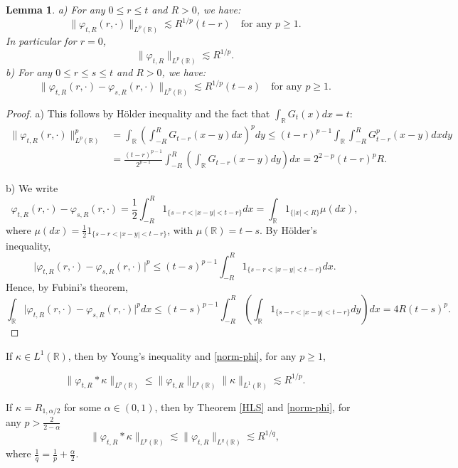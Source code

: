 \documentclass[12pt]{article}
\newtheorem{lemma}[theorem]{Lemma}
\def\bR{\mathbb{R}}
\newcommand{\les}{\lesssim}
\def\k{\kappa}
\begin{document}
\begin{lemma}
a) For any $0 \leq r\leq t$ and $R>0$, we have:
\begin{equation}
\label{norm-phi}
\|\varphi_{t,R}(r, \cdot)\|_{L^p(\bR)} \les R^{1/p}(t-r) \quad \mbox{for any $p\geq 1$}.
\end{equation} 
In particular for $r = 0$,
\[
\| \varphi_{t,R} \|_{L^p(\bR)} \les R^{1/p}.
\]
b) For any $0  \leq r\leq s\leq t$ and $R>0$, we have:
\begin{equation}
\label{tsPhiDif}
\|\varphi_{t,R}(r, \cdot)-\varphi_{s,R}(r, \cdot)\|_{L^p(\bR)} \les R^{1/p}(t-s) \quad \mbox{for any $p\geq 1$}.
\end{equation} 
\end{lemma}



\begin{proof}
a) This follows by H\"older inequality and the fact that $\int_{\bR}G_t(x)dx=t$:
\begin{align*}
\|\varphi_{t,R}(r,\cdot)\|_{L^p(\bR)}^{p}&=
\int_{\bR}\left(\int_{-R}^R G_{t-r}(x-y)dx\right)^p dy \leq (t-r)^{p-1} \int_{\bR}\int_{-R}^{R}G_{t-r}^p(x-y)dxdy\\
&=\frac{(t-r)^{p-1}}{2^{p-1}} \int_{-R}^{R}
\left(\int_{\bR}G_{t-r}(x-y)dy\right)dx = 2^{2-p} (t-r)^p R.
\end{align*}


b) We write
\[
\varphi_{t,R}(r, \cdot)-\varphi_{s,R}(r, \cdot)=\frac{1}{2}\int_{-R}^R 1_{\{s-r<|x-y|<t-r\}} dx=\int_{\bR}1_{\{|x|<R\}} \mu(dx),
\]
where $\mu(dx)=\frac{1}{2}1_{\{s-r<|x-y|<t-r\}}$, with $\mu(\bR)=t-s$. By H\"older's inequality,
\[
\big|\varphi_{t,R}(r, \cdot)-\varphi_{s,R}(r, \cdot)\big|^p \leq (t-s)^{p-1} \int_{-R}^R 1_{\{s-r<|x-y|<t-r\}} dx.
\]
Hence, by Fubini's theorem,
\[
\int_{\bR}\big|\varphi_{t,R}(r, \cdot)-\varphi_{s,R}(r, \cdot)\big|^p dx \leq (t-s)^{p-1} \int_{-R}^R \left(\int_{\bR}1_{\{s-r<|x-y|<t-r\}} dy\right) dx=4R (t-s)^p.
\]
\end{proof}

If $\k \in L^1(\bR)$, then by Young's inequality and \eqref{norm-phi}, for any $p\geq 1$,



\begin{equation}
\label{young-phi}
\| \varphi_{t,R}*\k \|_{L^p(\bR)} \leq \|\varphi_{t,R}\|_{L^p(\bR)} \|\k\|_{L^1(\bR)} \les R^{1/p}.
\end{equation}


If $\k =R_{1,\alpha/2}$ for some $\alpha \in (0,1)$, then by Theorem \ref{HLS} and \eqref{norm-phi}, for any $p>\frac{2}{2-\alpha}$
\begin{equation}
\label{HLS-phi}
\| \varphi_{t,R}*\k \|_{L^p(\bR)} \les \|\varphi_{t,R}\|_{L^q(\bR)}  \les R^{1/q},
\end{equation}
where $\frac{1}{q}=\frac{1}{p}+\frac{\alpha}{2}$.
\end{document}
